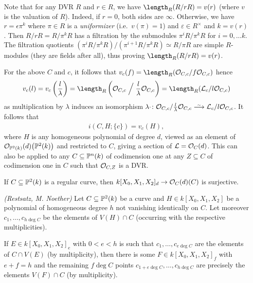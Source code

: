 \documentclass[a4paper,parskip=half,numbers=enddot, DIV=12, headheight=30pt]{scrreprt}
\begin{document}
Note that for any DVR $R$ and $r\in R$, we have $\length_R(R/rR) = v(r)$ (where $v$ is the valuation of $R$). Indeed, if
$r=0$, both sides are $\infty$. Otherwise, we have $r=\epsilon\pi^k$ where $\pi\in R$ is a \emph{uniformizer} (i.e.\ $v(\pi)=1$) and $\varepsilon \in R^\times$ and $k=v(r)$. Then $R/rR = R/\pi^kR$ has
a filtration by the submodules $\pi^iR/\pi^kR$ for $i=0,\ldots k$.
The filtration quotients $(\pi^i R/\pi^k R)/(\pi^{i+1} R/\pi^k R) \simeq R/\pi R$ are simple $R$-modules (they are fields after all), thus proving $\length_R(R/rR)=v(r)$.

For the above $C$ and $c$, it follows that $v_c(f) = \length_R(\Oo_{C,c}/f\Oo_{C,c})$ hence
\begin{align*}
	v_c(l) = v_c\left(\frac l\lambda\right) = \length_R\left(\Oo_{C,c}\Bigm/\frac l\lambda\Oo_{C,c}\right)
	=\length_R(\Ll_c/l\Oo_{C,c}) 
\end{align*}
as multiplication by $\lambda$ induces an isomorphism $\lambda\cdot\colon \Oo_{C,c}/\frac l\lambda \Oo_{C,c}\isomorphism \Ll_c/l\Oo_{C,c}$.
It follows that
\begin{align*}%
i(C,H;\{c\}) = v_c(H),
\end{align*}
where $H$ is any homogeneous polynomial of degree $d$, viewed as an element of
$\mathcal{O}_{\mathbb{P}^2(k)}(d)\big(\mathbb{P}^2(k)\big)$ and restricted to $C$, giving a section
of $\mathcal{L} = \mathcal{O}_C(d)$.
This can also be applied to any $C\subseteq \mathbb{P}^n(k)$ of codimension one at any $Z\subseteq C$ of codimension one in $C$ such that
$\mathcal{O}_{C,Z}$ is a DVR.
\begin{thm}
\begin{alphanumerate}
\item{} If $C\subseteq \mathbb{P}^2(k)$ is a regular curve, then $k[X_0,X_1,X_2]_d\morphism \Oo_C(d)(C)$ is surjective.
\item \emph{(Restsatz, M. Noether)} Let $C\subseteq \mathbb{P}^2(k)$ be a curve and $H\in k[X_0,X_1,X_2]$ be a polynomial of homogeneous degree $h$
not vanishing identically on $C$. Let moreover $c_1,\dotsc,c_{h\deg C}$ be the elements of $V(H)\cap C$ (occurring with the respective multiplicities).

If $E\in k[X_0,X_1,X_2]_e$ with $0<e<h$ is such that $c_1,\dotsc,c_{e\deg C}$ are the elements of $C\cap V(E)$ (by multiplicity),
then there is some $F\in k[X_0,X_1,X_2]_f$ with $e+f=h$
and the remaining $f\deg C$ points $c_{1+e\deg C},\dotsc, c_{h\deg C}$ are precisely the elements $V(F)\cap C$ (by multiplicity).
\end{alphanumerate}
\end{thm}
\end{document}
